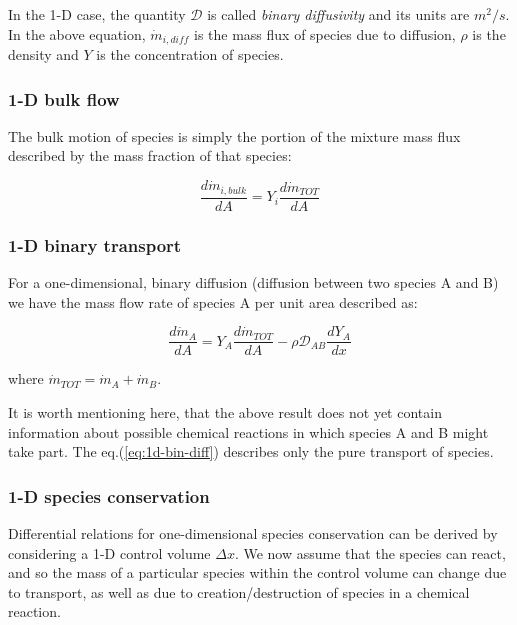 \documentclass[10pt,twocolumn]{article}
\begin{document}
In the 1-D case, the quantity $\mathcal{D}$ is called \textit{binary diffusivity} and its units are $m^2/s$. In the above equation, $\dot{m}_{i, diff}$ is the mass flux of species due to diffusion, $\rho$ is the density and $Y$ is the concentration of species.

\subsubsection{1-D bulk flow}

The bulk motion of species is simply the portion of the mixture mass flux described by the mass fraction of that species:

\begin{equation}
\frac{d \dot{m}_{i, bulk}}{dA} = Y_i \frac{d \dot{m}_{TOT}}{d A}
\end{equation}

\subsubsection{1-D binary transport}

For a one-dimensional, binary diffusion (diffusion between two species A and B) we have the mass flow rate of species A per unit area described as:

\begin{equation}
\frac{d \dot{m}_A }{dA} = Y_A \frac{d \dot{m}_{TOT}}{d A} - \rho \mathcal{D}_{AB} \frac{dY_A}{dx}
\end{equation}\label{eq:1d-bin-diff}

where $\dot{m}_{TOT} = \dot{m}_A + \dot{m}_B$.

It is worth mentioning here, that the above result does not yet contain information about possible chemical reactions in which species A and B might take part. The eq.(\ref{eq:1d-bin-diff}) describes only the pure transport of species.

\subsubsection{1-D species conservation}

Differential relations for one-dimensional species conservation can be derived by considering a 1-D control volume $\Delta x$. We now assume that the species can react, and so the mass of a particular species within the control volume can change due to transport, as well as due to creation/destruction of species in a chemical reaction. 
\end{document}
